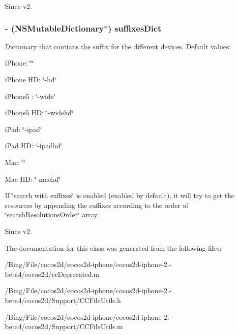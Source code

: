 \begin{DoxySince}{Since}
v2. 
\end{DoxySince}
\hypertarget{class_c_c_file_utils_ae99815d4f19714d88f920f53946b60d3}{
\subsubsection[{suffixes\-Dict}]{\setlength{\rightskip}{0pt plus 5cm}-\/ (N\-S\-Mutable\-Dictionary$\ast$) {\bf suffixes\-Dict}}}\label{class_c_c_file_utils_ae99815d4f19714d88f920f53946b60d3}
Dictionary that contians the suffix for the different devices. Default values\-:
\begin{DoxyItemize}
\item i\-Phone\-: \char`\"{}\char`\"{}
\item i\-Phone H\-D\-: \char`\"{}-\/hd\char`\"{}
\item i\-Phone5 \-: \char`\"{}-\/wide\char`\"{}
\item i\-Phone5 H\-D\-: \char`\"{}-\/widehd\char`\"{}
\item i\-Pad\-: \char`\"{}-\/ipad\char`\"{}
\item i\-Pad H\-D\-: \char`\"{}-\/ipadhd\char`\"{}
\item Mac\-: \char`\"{}\char`\"{}
\item Mac H\-D\-: \char`\"{}-\/machd\char`\"{}
\end{DoxyItemize}

If \char`\"{}search with suffixes\char`\"{} is enabled (enabled by default), it will try to get the resources by appending the suffixes according to the order of \char`\"{}search\-Resolutions\-Order\char`\"{} array. \begin{DoxySince}{Since}
v2. 
\end{DoxySince}


The documentation for this class was generated from the following files\-:\begin{DoxyCompactItemize}
\item 
/\-Bing/\-File/cocos2d/cocos2d-\/iphone/cocos2d-\/iphone-\/2.-\/beta4/cocos2d/cc\-Deprecated.\-m\item 
/\-Bing/\-File/cocos2d/cocos2d-\/iphone/cocos2d-\/iphone-\/2.-\/beta4/cocos2d/\-Support/C\-C\-File\-Utils.\-h\item 
/\-Bing/\-File/cocos2d/cocos2d-\/iphone/cocos2d-\/iphone-\/2.-\/beta4/cocos2d/\-Support/C\-C\-File\-Utils.\-m\end{DoxyCompactItemize}
